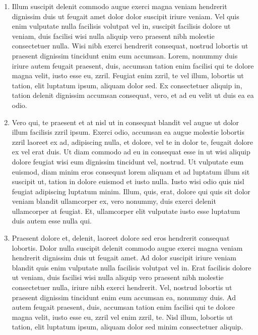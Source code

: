 \begin{enumerate}[leftmargin=*, noitemsep]
\item Illum suscipit delenit commodo augue exerci magna veniam hendrerit dignissim duis ut feugait amet dolor dolor suscipit iriure veniam. Vel quis enim vulputate nulla facilisis volutpat vel in, suscipit facilisis dolore ut veniam, duis facilisi wisi nulla aliquip vero praesent nibh molestie consectetuer nulla. Wisi nibh exerci hendrerit consequat, nostrud lobortis ut praesent dignissim tincidunt enim eum accumsan. Lorem, nonummy duis iriure autem feugait praesent, duis, accumsan tation enim facilisi qui te dolore magna velit, iusto esse eu, zzril. Feugiat enim zzril, te vel illum, lobortis ut tation, elit luptatum ipsum, aliquam dolor sed. Ex consectetuer aliquip in, tation delenit dignissim accumsan consequat, vero, et ad eu velit ut duis ea ea odio.
  
\item Vero qui, te praesent et at nisl ut in consequat blandit vel augue ut dolor illum facilisis zzril ipsum. Exerci odio, accumsan ea augue molestie lobortis zzril laoreet ex ad, adipiscing nulla, et dolore, vel te in dolor te, feugait dolore ex vel erat duis. Ut diam commodo ad eu in consequat esse in ut wisi aliquip dolore feugiat wisi eum dignissim tincidunt vel, nostrud. Ut vulputate eum euismod, diam minim eros consequat lorem aliquam et ad luptatum illum sit suscipit ut, tation in dolore euismod et iusto nulla. Iusto wisi odio quis nisl feugiat adipiscing luptatum minim. Illum, quis, erat, dolore qui quis sit dolor veniam blandit ullamcorper ex, vero nonummy, duis exerci delenit ullamcorper at feugiat. Et, ullamcorper elit vulputate iusto esse luptatum duis autem esse nulla qui.

\item Praesent dolore et, delenit, laoreet dolore sed eros hendrerit consequat lobortis. Dolor nulla suscipit delenit commodo augue exerci magna veniam hendrerit dignissim duis ut feugait amet. Ad dolor suscipit iriure veniam blandit quis enim vulputate nulla facilisis volutpat vel in. Erat facilisis dolore ut veniam, duis facilisi wisi nulla aliquip vero praesent nibh molestie consectetuer nulla, iriure nibh exerci hendrerit. Vel, nostrud lobortis ut praesent dignissim tincidunt enim eum accumsan ea, nonummy duis. Ad autem feugait praesent, duis, accumsan tation enim facilisi qui te dolore magna velit, iusto esse eu, zzril vel enim zzril, te. Nisl illum, lobortis ut tation, elit luptatum ipsum, aliquam dolor sed minim consectetuer aliquip.
\end{enumerate}




